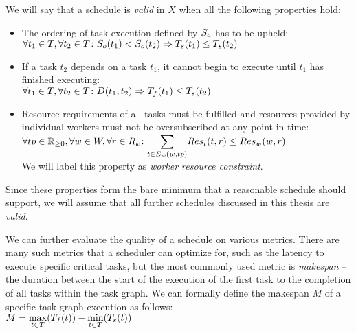 We will say that a schedule is \emph{valid} in $X$ when all the
following properties hold:

\begin{itemize}
	\item The ordering of task execution defined by $S_o$ has to be upheld: \\
	      $\forall t_1\in{}T, \forall t_2\in{}T\colon S_o(t_1) < S_o(t_2) \Rightarrow T_s(t_1) \leq
		      T_s(t_2)$
	\item If a task $t_2$ depends on a task $t_1$, it cannot begin to
	      execute until $t_1$ has finished executing: \\ $\forall t_1\in{}T, \forall t_2\in{}T\colon D(t_1, t_2) \Rightarrow T_f(t_1) \leq T_s(t_2)$
	\item[\makedef{def:worker_resource_constraint}] Resource requirements of all tasks must be fulfilled and resources provided by individual workers
		must not be oversubscribed at any point in time: \\ $\forall tp\in\timedomain, \forall w\in{}W, \forall
			r\in{}\setresourcekinds\colon
			\mathlarger{\sum}_{t\in{}\fnworkertaskassigned(w, tp)} \fntaskres(t, r) \leq
			\fnworkerres(w, r)$ \\ We will label this
		property as \emph{worker resource constraint}.
\end{itemize}

Since these properties form the bare minimum that a reasonable schedule should support, we will
assume that all further schedules discussed in this thesis are \emph{valid}.

We can further evaluate the quality of a schedule on various metrics. There are many such metrics
that a scheduler can optimize for, such as the latency to execute specific critical tasks, but the
most commonly used metric is \emph{makespan} -- the duration between the start of the
execution of the first task to the completion of all tasks within the task graph. We can formally
define the makespan $M$ of a specific task graph execution as follows: \\
$M = \max\limits_{t \in T}(T_f(t)) - \min\limits_{t \in T}(T_s(t))$

